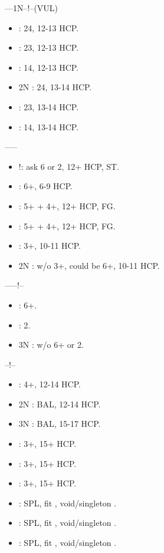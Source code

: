 \documentclass[12pt,twoside,a5paper]{report}%
\begin{document}
	----1N--!--(VUL)
	\begin{itemize}
	\renewcommand{\labelitemi}{}
	\item {} : 2\di{}4\cl{}, 12-13 HCP.
	\item {} : 2\di{}3\cl{}, 12-13 HCP.
	\item {} : 1\di{}4\cl{}, 12-13 HCP.
	\item 2N : 2\di{}4\cl{}, 13-14 HCP.
	\item {} : 2\di{}3\cl{}, 13-14 HCP.
	\item {} : 1\di{}4\cl{}, 13-14 HCP.
	\end{itemize}

	------
	\begin{itemize}
	\renewcommand{\labelitemi}{}
	\item {}!: ask 6\cl{} or 2\di{}, 12+ HCP, ST.
	\item {} : 6+\di{}, 6-9 HCP.
	\item {} : 5+\di{} + 4+\he{}, 12+ HCP, FG.
	\item {} : 5+\di{} + 4+\sp{}, 12+ HCP, FG.
	\item {} : 3+\cl{}, 10-11 HCP.
	\item 2N : w/o 3+\cl{}, could be 6+\di{}, 10-11 HCP.
	\end{itemize}

	------!--
	\begin{itemize}
	\renewcommand{\labelitemi}{}
	\item {} : 6+\cl{}.
	\item {} : 2\di{}.
	\item 3N : w/o  6+\cl{} or 2\di{}.
	\end{itemize}

	--!--
	\begin{itemize}
	\renewcommand{\labelitemi}{}
	\item {} : 4+\cl{}, 12-14 HCP.
	\item 2N : BAL, 12-14 HCP.
	\item 3N : BAL, 15-17 HCP.
	\item {} : 3+\di{}, 15+ HCP.
	\item {} : 3+\he{}, 15+ HCP.
	\item {} : 3+\sp{}, 15+ HCP.
	\item {} : SPL, fit \cl{}, void/singleton \di{}.
	\item {} : SPL, fit \cl{}, void/singleton \he{}.
	\item {} : SPL, fit \cl{}, void/singleton \sp{}.
	\end{itemize}
	
\end{document}
